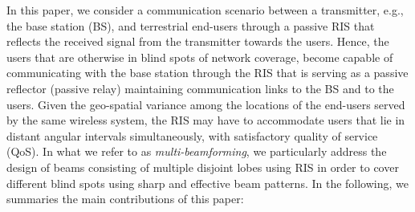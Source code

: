 In this paper, we consider a communication scenario between a transmitter, e.g., the base station (BS), and terrestrial end-users through a passive RIS that reflects the received signal from the transmitter towards the users. Hence, the users that are otherwise in blind spots of network coverage, become capable of communicating with the base station through the RIS that is serving as a passive reflector (passive relay) maintaining  communication links to the BS and to the users. Given the geo-spatial variance among the locations of the end-users served by the same wireless system, the RIS may have to accommodate users that lie in distant angular intervals simultaneously, with satisfactory quality of service (QoS). In what we refer to as \emph{multi-beamforming}, we particularly address the design of beams consisting of multiple disjoint lobes using RIS in order to cover different blind spots using sharp and effective beam patterns. In the following, we summaries the main contributions of this paper: 
